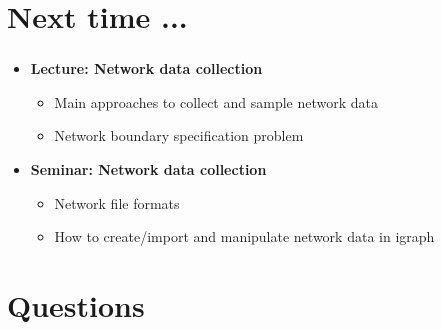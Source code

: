 \documentclass[8pt]{beamer}
\begin{document}
\section*{Next time ...}


\bgroup
{}
\begin{frame}[plain]{}
\begin{center}
\color{white}{\Huge\insertsection}
\end{center}
\end{frame}
\egroup


\begin{frame}
\frametitle{\insertsection}

\begin{itemize}
\item 	\textbf{Lecture: Network data collection}
	\begin{itemize}
	\item Main approaches to collect and sample network data 
	\item Network boundary specification problem
	\end{itemize}
	
\medskip
\medskip
\item 	\textbf{Seminar: Network data collection}
	\begin{itemize}
	\item Network file formats 
	\item How to create/import and manipulate network data in igraph
	\end{itemize}	

\end{itemize}

\end{frame}







\section*{Questions}


\bgroup
{}
\begin{frame}[plain]{}
\begin{center}
\color{white}{\Huge\insertsection}
\end{center}
\end{frame}
\egroup

\end{document}
